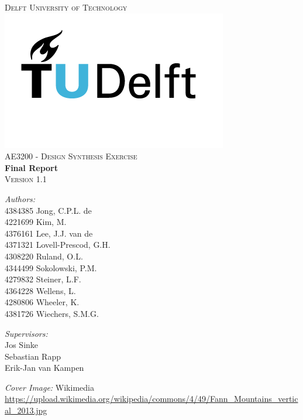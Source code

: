 \begin{titlepage}
\begin{center}

\textsc{\LARGE Delft University of Technology}\\[1.5cm]
\includegraphics[scale=0.45]{TU_Delft_logo_RGB.png}\\[0.5cm]
\textsc{\Large AE3200 - Design Synthesis Exercise}\\[0.5cm]
{\huge\textbf{Final Report} \\[.2cm] \Large\textsc{Version 1.1}\\[1.0cm]}

\begin{minipage}[t]{0.4\textwidth}
\begin{flushleft} \large
\emph{Authors:}\\
    4384385  Jong, C.P.L. de\\
    4221699  Kim, M.\\
    4376161  Lee, J.J. van de\\
    4371321  Lovell-Prescod, G.H.\\
    4308220  Ruland, O.L.\\
    4344499  Sokolowski, P.M.\\
    4279832  Steiner, L.F.\\
    4364228  Wellens, L.\\
    4280806  Wheeler, K.\\
    4381726  Wiechers, S.M.G.
    

\end{flushleft}
\end{minipage}
\begin{minipage}[t]{0.4\textwidth}
\begin{flushright} \large
\emph{Supervisors:} \\
    Jos Sinke\\
    Sebastian Rapp\\
    Erik-Jan van Kampen
    
    
\end{flushright}
\end{minipage}
\vfill
\textit{Cover Image:} Wikimedia\\
\small
\url{https://upload.wikimedia.org/wikipedia/commons/4/49/Fann_Mountains_vertical_2013.jpg}

\end{center}
\end{titlepage}
\restoregeometry